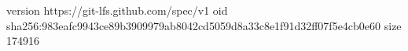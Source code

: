 version https://git-lfs.github.com/spec/v1
oid sha256:983eafc9943ce89b3909979ab8042cd5059d8a33c8e1f91d32ff07f5e4cb0e60
size 174916

